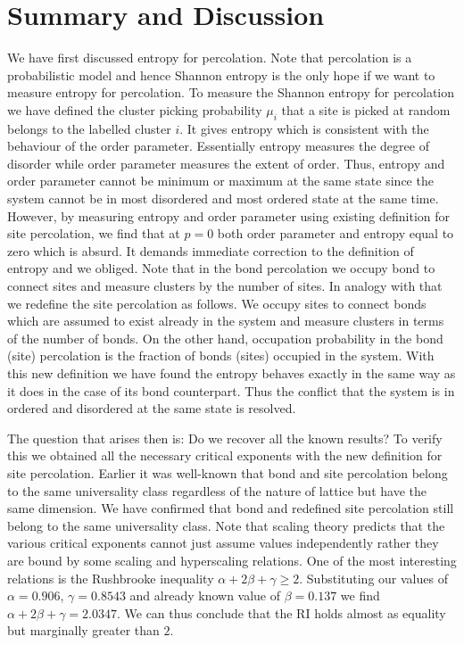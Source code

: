 
\chapter{Summary and Discussion}
\label{chapter.summary}


We have first discussed entropy for percolation. Note that percolation
is a probabilistic model and hence Shannon entropy is the only hope if we want to measure entropy 
for percolation. To measure the Shannon entropy for percolation we 
have defined the cluster picking probability $\mu_i$ that a site is picked at random belongs to
the labelled cluster $i$. It gives entropy which is consistent with the behaviour 
of the order parameter. Essentially entropy measures 
the degree of disorder while order parameter measures the extent of order. Thus, entropy and order parameter cannot be minimum or maximum 
at the same state since the system cannot be in most disordered and most ordered state at the same time.
However, by measuring entropy and order parameter using existing definition for site percolation, we find
that at $p=0$ both order parameter and entropy equal 
to zero which is absurd. It demands immediate correction to the definition of entropy and we obliged. 
Note that in the bond percolation we occupy bond to connect sites and measure clusters by the
number of sites. In analogy with that we redefine the site percolation as follows. We occupy sites to connect 
bonds which are assumed to exist already in the system and measure clusters in terms of the number of bonds. On the other hand, occupation probability in the bond (site) percolation is the fraction of bonds (sites) occupied
in the system. With this new definition we have found the entropy behaves exactly in the same way as 
it does in the case of its bond counterpart. Thus the conflict that the system is in ordered and disordered 
at the same state is resolved. 


The question that arises then is: Do we recover all the known results? To verify
this we obtained all the necessary critical exponents with the new definition for 
site percolation. Earlier it was well-known that bond and site percolation belong to the
same universality class regardless of the nature of lattice but have the same dimension.
We have confirmed that bond and redefined site percolation still belong to the same universality class. 
Note that scaling theory predicts that the various critical exponents cannot just assume values 
independently  rather they are bound by some scaling and hyperscaling relations. One
of the most interesting relations is the Rushbrooke inequality $\alpha+2\beta+\gamma\geq 2$.
Substituting our values of $\alpha=0.906$, $\gamma=0.8543$ and already
known value of $\beta=0.137$ we find $\alpha+2\beta+\gamma=2.0347$. 
We can thus conclude that the RI holds almost as equality but marginally greater
than $2$. 





